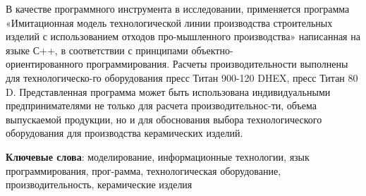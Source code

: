 В качестве программного инструмента в исследовании, применяется
программа «Имитационная модель технологической линии производства
строительных изделий с использованием отходов про-мышленного
производства» написанная на языке С++, в соответствии с принципами
объектно-\\ориентированного программирования. Расчеты производительности
выполнены для технологическо-го оборудования пресс Титан 900-120 DHEX,
пресс Титан 80 D. Представленная программа может быть использована
индивидуальными предпринимателями не только для расчета
производительнос-ти, объема выпускаемой продукции, но и для обоснования
выбора технологического оборудования для производства керамических
изделий.

{\bfseries Ключевые слова}: моделирование, информационные технологии, язык
программирования, прог-рамма, технологическая оборудование,
производительность, керамические изделия
